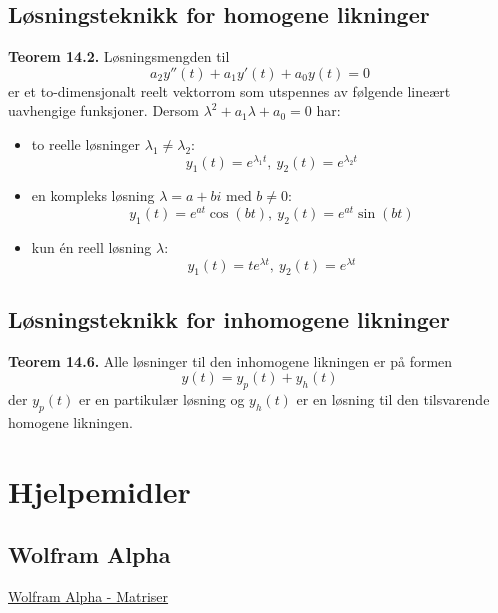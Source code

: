 \documentclass{article}
\begin{document}
\subsection{Løsningsteknikk for homogene likninger}
\textbf{Teorem 14.2.} Løsningsmengden til
\[ a_2y''(t) + a_1y'(t) + a_0y(t) = 0 \]
er et to-dimensjonalt reelt vektorrom som utspennes av følgende lineært uavhengige funksjoner. Dersom $\lambda ^2 + a_1\lambda + a_0 = 0$ har:
\begin{itemize}
    \item to reelle løsninger $\lambda_1 \neq \lambda_2$:
    \[ y_1(t) = e^{\lambda_1 t}, \ y_2(t) = e^{\lambda_2 t} \]
    \item en kompleks løsning $\lambda = a + bi$ med $b \neq 0$:
    \[ y_1(t) = e^{at}\cos{(bt)}, \ y_2(t) = e^{at}\sin{(bt)} \]
    \item kun én reell løsning $\lambda$:
    \[ y_1(t) = te^{\lambda t}, \ y_2(t) = e^{\lambda t} \]
\end{itemize}


\subsection{Løsningsteknikk for inhomogene likninger}
\textbf{Teorem 14.6.} Alle løsninger til den inhomogene likningen er på formen
\[ y(t) = y_p(t) + y_h(t) \]
der $y_p(t)$ er en partikulær løsning og $y_h(t)$ er en løsning til den tilsvarende homogene likningen.




\clearpage
\section{Hjelpemidler}


\subsection{Wolfram Alpha}
\href{https://www.wolframalpha.com/input/?i=matrices}{Wolfram Alpha - Matriser}
\end{document}
